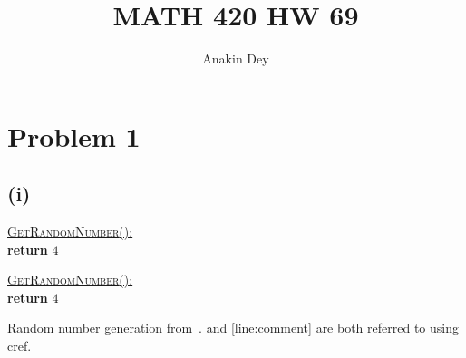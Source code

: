 \documentclass[letterpaper]{article}
\title{MATH 420 HW 69}
\author{Anakin Dey}
\begin{document}
\maketitle

\section*{Problem 1}
\subsection*{(i)}

\begin{algo}[1.3]
    \underline{\textsc{GetRandomNumber}():}\+
\\      \textbf{return} $4$   
\\      \hspace{39.00pt}
\end{algo}

\begin{nalgo}
                    \underline{\textsc{GetRandomNumber}():}\+
\\\label{line:ret}      \textbf{return} $4$   
\\\label{line:comment}  \hspace{39.00pt}
\end{nalgo}

Random number generation from~\cite{site:xkcd}.  and \cref{line:comment} are both referred to using cref.

\end{document}
